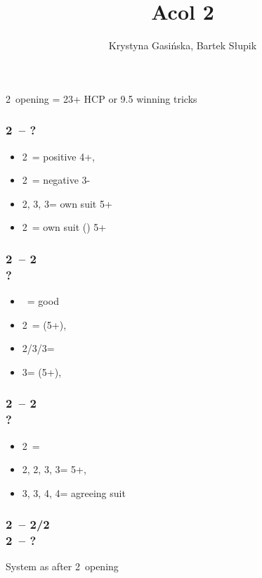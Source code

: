 \documentclass[12pt, a4paper]{article}
\title{Acol 2\clubsuit}
\author{Krystyna Gasińska, Bartek Słupik}
\begin{document}
\maketitle


2\clubs\ opening = 23+ HCP or 9.5 winning tricks

\subsubsection*{2\clubs\ -- ?}
\begin{itemize}
    \item 2\diams\ = positive 4+, \gf
    \item 2\hearts\ = negative 3-
    \item 2\spades, 3\clubs, 3\diams = own suit 5+
    \item 2\nt\ = own suit (\hearts) 5+
\end{itemize}

\subsubsection*{2\clubs\ -- 2\hearts \\ ?}
\begin{itemize}
    \item \pass\ = good \hearts
    \item 2\spades\ = \nat (5+), \fonce
    \item 2\nt/3\clubs/3\diams = \nf
    \item 3\hearts = \nat (5+), \gf
\end{itemize}

\subsubsection*{2\clubs\ -- 2\diams \\ ?}
\begin{itemize}
    \item 2\nt\ = \bal
    \item 2\hearts, 2\spades, 3\clubs, 3\diams = 5+, \unbal
    \item 3\hearts, 3\spades, 4\clubs, 4\diams = agreeing suit
\end{itemize}

\subsubsection*{2\clubs\ -- 2\diams/2\hearts \\ 2\nt\ -- ?}
System as after 2\nt\ opening
\end{document}
